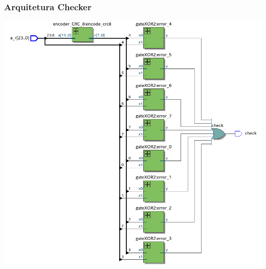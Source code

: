 \documentclass{beamer}
\begin{document}
\begin{frame}
\frametitle{Arquitetura Checker}
\includegraphics[scale=0.25]{arq_checker.png}
\end{frame}
\end{document}
